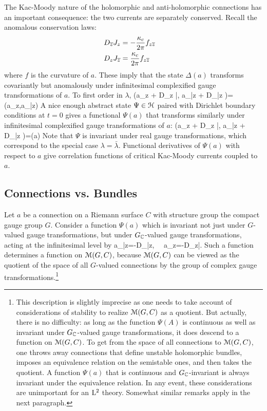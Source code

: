 \documentclass[11pt,a4paper]{article}
\begin{document}
The Kac-Moody nature of the holomorphic and anti-holomorphic connections has an important consequence: 
the two currents are separately conserved. Recall the anomalous conservation laws:
\begin{align}
D_{\bar z} J_z &= - \frac{\kappa_c}{2 \pi} f_{z \bar z} \cr
D_z J_{\bar z} &= \frac{\kappa_c}{2 \pi} f_{z \bar z}
\end{align}
where $f$ is the curvature of $a$. These imply that the state $\Delta(a)$ transforms covariantly but anomalously under infinitesimal
complexified gauge transformations of $a$.  To first order in $\lambda$,
\be 
\Delta(a_z + D_z \bar \lambda, a_{\bar z} + D_{\bar z} \lambda )= \Delta(a_z,a_{\bar z})
\ee
A nice enough abstract state $\Psi \in \H$ paired with Dirichlet boundary conditions  at $t=0$ gives a functional 
$\Psi(a)$ that transforms similarly under infinitesimal complexified gauge transformations of $a$:
\be \label{eq:cogauge}
\Psi(a_z + D_z \bar \lambda, a_{\bar z} + D_{\bar z} \lambda )= \Psi(a)
\ee  Note that $\Psi$ is invariant under real gauge transformations, which correspond to the special case $\lambda=\bar\lambda$.
Functional derivatives of $\Psi(a)$ with respect to $a$ give  correlation functions of critical Kac-Moody currents coupled to $a$. 

\subsection{Connections vs. Bundles}\label{CB}

Let $a$ be a connection on a Riemann surface $C$ with structure group the compact gauge group $G$.  Consider a function $\Psi(a)$ which
is invariant not just under $G$-valued gauge transformations, but under $G_\C$-valued gauge transformations, acting at the infinitesimal level by
\be\label{actfor}\delta a_{\bar z}=-D_{\bar z}\lambda, ~~\delta a_z=-D_z\bar\lambda. \ee
Such a function determines a function on $\M(G,C)$, because $\M(G,C)$ can be viewed as the quotient of the space of all $G$-valued connections by
the group of complex gauge transformations.\footnote{This description is slightly imprecise as one needs to take account of considerations of stability
to realize $\M(G,C)$ as a quotient.   But actually, there is no difficulty: as long as the function $\Psi(A)$ is continuous as well as invariant under $G_\C$-valued
gauge transformations, it does descend to  a function on $\M(G,C)$.   To get from the space of all connections to $\M(G,C)$, one throws away connections
that define unstable holomorphic bundles, imposes an equivalence relation on the semistable ones, and then takes the quotient.   A function $\Psi(a)$
that is continuous and $G_\C$-invariant is always invariant under the equivalence relation.   In any event, these considerations are unimportant for an $\lmark^2$
theory. Somewhat similar remarks apply in the next paragraph.}
\end{document}
